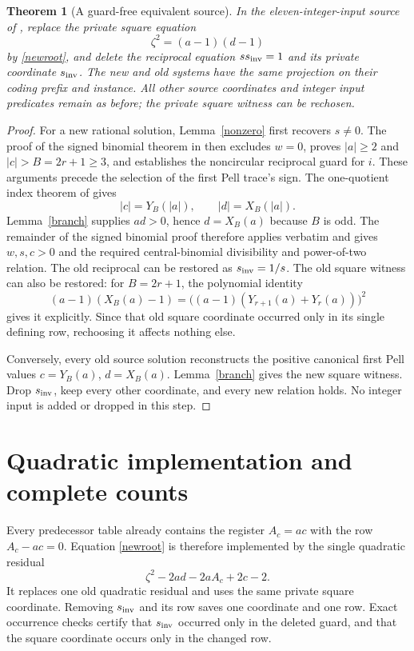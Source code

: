 \documentclass[11pt]{article}
\newtheorem{theorem}{Theorem}
\begin{document}
\begin{theorem}[A guard-free equivalent source]\label{source}
In the eleven-integer-input source of \cite{CRT}, replace the private
square equation
\[
                   \zeta^2=(a-1)(d-1)
\]
by \eqref{newroot}, and delete the reciprocal equation
\(s s_{\rm inv}=1\) and its private coordinate \(s_{\rm inv}\).
The new and old systems have the same projection on their coding
prefix and instance. All other source coordinates and integer input
predicates remain as before; the private square witness can be
rechosen.
\end{theorem}
\begin{proof}
For a new rational solution, Lemma~\ref{nonzero} first recovers
\(s\ne0\). The proof of the signed binomial theorem in
\cite{Signed} then excludes \(w=0\), proves \(|a|\ge2\) and
\(|c|>B=2r+1\ge3\), and establishes the noncircular reciprocal
guard for \(i\). These arguments precede the selection of the first
Pell trace's sign. The one-quotient index theorem of \cite{CRT}
gives
\[
                   |c|=Y_B(|a|),\qquad |d|=X_B(|a|).
\]
Lemma~\ref{branch} supplies \(ad>0\), hence \(d=X_B(a)\)
because \(B\) is odd. The remainder of the signed binomial proof
therefore applies verbatim and gives \(w,s,c>0\) and the required
central-binomial divisibility and power-of-two relation. The old
reciprocal can be restored as \(s_{\rm inv}=1/s\). The old square
witness can also be restored: for \(B=2r+1\), the polynomial
identity
\[
 (a-1)(X_B(a)-1)
   =\bigl((a-1)(Y_{r+1}(a)+Y_r(a))\bigr)^2
\]
gives it explicitly. Since that old square coordinate occurred only
in its single defining row, rechoosing it affects nothing else.

Conversely, every old source solution reconstructs the positive
canonical first Pell values \(c=Y_B(a)\), \(d=X_B(a)\).
Lemma~\ref{branch} gives the new square witness. Drop
\(s_{\rm inv}\), keep every other coordinate, and every new
relation holds. No integer input is added or dropped in this step.
\end{proof}

\section{Quadratic implementation and complete counts}

Every predecessor table already contains the register
\(A_c=ac\) with the row \(A_c-ac=0\). Equation
\eqref{newroot} is therefore implemented by the single quadratic
residual
\begin{equation}\label{quad}
                    \zeta^2-2ad-2aA_c+2c-2.
\end{equation}
It replaces one old quadratic residual and uses the same private
square coordinate. Removing \(s_{\rm inv}\) and its row saves
one coordinate and one row. Exact occurrence checks certify that
\(s_{\rm inv}\) occurred only in the deleted guard, and that the
square coordinate occurs only in the changed row.
\end{document}
